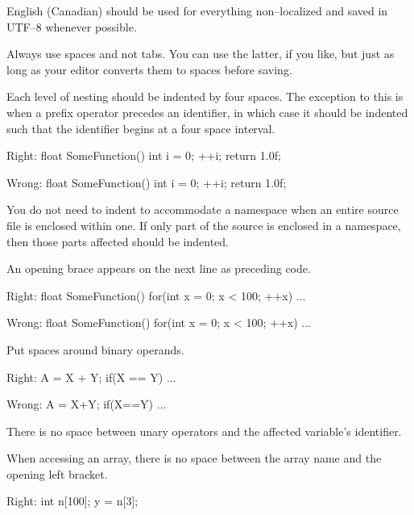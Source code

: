 
\startitemize[4]
\item
English (Canadian) should be used for everything non--localized and saved in UTF--8 whenever possible.

\item
Always use spaces and not tabs. You can use the latter, if you like, but just as long as your editor converts them to spaces before saving.

\item
Each level of nesting should be indented by four spaces. The exception to this is when a prefix operator precedes an identifier, in which case it should be indented such that the identifier begins at a four space interval.

Right:
\startCodeExample
float SomeFunction()
{
    int i = 0;
  ++i;
    return 1.0f;
}
\stopCodeExample

Wrong:
\startCodeExample
float SomeFunction()
{
    int i = 0;
    ++i;
    return 1.0f;
}
\stopCodeExample

\item
You do not need to indent to accommodate a namespace when an entire source file is enclosed within one. If only part of the source is enclosed in a namespace, then those parts affected should be indented.

\item
An opening brace appears on the next line as preceding code.

Right:
\startCodeExample
float SomeFunction()
{
    for(int x = 0; x < 100; ++x)
    {
        ...
    }
}
\stopCodeExample

Wrong:
\startCodeExample
float SomeFunction() {
    for(int x = 0; x < 100; ++x) {
        ...
    }
}
\stopCodeExample

\item
Put spaces around binary operands.

Right:
\startCodeExample
A = X + Y;
if(X == Y)
    ...
\stopCodeExample

Wrong:
\startCodeExample
A = X+Y;
if(X==Y)
    ...
\stopCodeExample

\item
There is no space between unary operators and the affected variable's identifier.

\item
When accessing an array, there is no space between the array name and the opening left bracket. 

Right:
\startCodeExample
int n[100];
y = n[3];
\stopCodeExample

